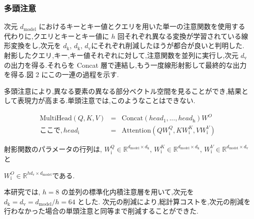 \documentclass{jarticle}     %
\begin{document}
\subsubsection{多頭注意}
次元 $d_\mathrm{model}$ におけるキーとキー値とクエリを用いた単一の注意関数を使用する代わりに,クエリとキーとキー値に $h$ 回それぞれ異なる変換が学習されている線形変換をし,次元を $d_\mathrm{k}$, $d_\mathrm{k}$, $d_\mathrm{v}$にそれぞれ削減したほうが都合が良いと判明した.
射影したクエリ,キー,キー値それぞれに対して,注意関数を並列に実行し,次元 $d_\mathrm{v}$ の出力を得る.それらを Concat 層で連結し,もう一度線形射影して最終的な出力を得る.図 2 にこの一連の過程を示す.
\par
多頭注意により,異なる要素の異なる部分ベクトル空間を見ることができ,結果として表現力が高まる\cite{Multihead}.単頭注意では,このようなことはできない.
\par

\begin{eqnarray*}
  \mathrm{MultiHead}(Q,K,V)&  = & \mathrm{Concat}(head_\mathrm{1},...,head_\mathrm{h})W^O   \\
  ここで, head_\mathrm{i} & = & \mathrm{Attention}(QW_\mathrm{i}^Q,KW_\mathrm{i}^K,VW_\mathrm{i}^V)
\end{eqnarray*}

射影関数のパラメータの行列は,
$W_\mathrm{i}^Q \in \mathbb{R} ^ {{d_\mathrm{model}} \times {d_\mathrm{k}}}$,
$W_\mathrm{i}^K \in \mathbb{R} ^ {{d_\mathrm{model}} \times {d_\mathrm{k}}}$,
$W_\mathrm{i}^V \in \mathbb{R} ^ {{d_\mathrm{model}} \times {d_\mathrm{v}}}$と\par
$W_\mathrm{i}^O \in \mathbb{R} ^ {{hd_\mathrm{v}} \times {d_\mathrm{model}}}$である.

本研究では, $h=8$ の並列の標準化内積注意層を用いて,次元を
 $d_\mathrm{k} = d_\mathrm{v} = d_\mathrm{model}/h = 64$ とした.
次元の削減により,総計算コストを,次元の削減を行わなかった場合の単頭注意と同等まで削減することができた.
\end{document}
